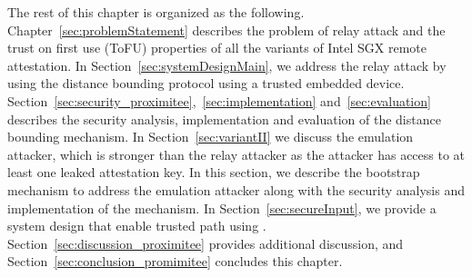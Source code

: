 The rest of this chapter is organized as the following. Chapter~\ref{sec:problemStatement} describes the problem of relay attack and the trust on first use (ToFU) properties of all the variants of Intel SGX remote attestation. In Section~\ref{sec:systemDesignMain}, we address the relay attack by using the distance bounding protocol using a trusted embedded device. Section~\ref{sec:security_proximitee},~\ref{sec:implementation} and~\ref{sec:evaluation} describes the security analysis, implementation and evaluation of the distance bounding mechanism. In Section~\ref{sec:variantII} we discuss the emulation attacker, which is stronger than the relay attacker as the attacker has access to at least one leaked attestation key. In this section, we describe the bootstrap mechanism to address the emulation attacker along with the security analysis and implementation of the mechanism. In Section~\ref{sec:secureInput}, we provide a system design that enable trusted path using \proximitee. Section~\ref{sec:discussion_proximitee} provides additional discussion, and Section~\ref{sec:conclusion_promimitee} concludes this chapter.
